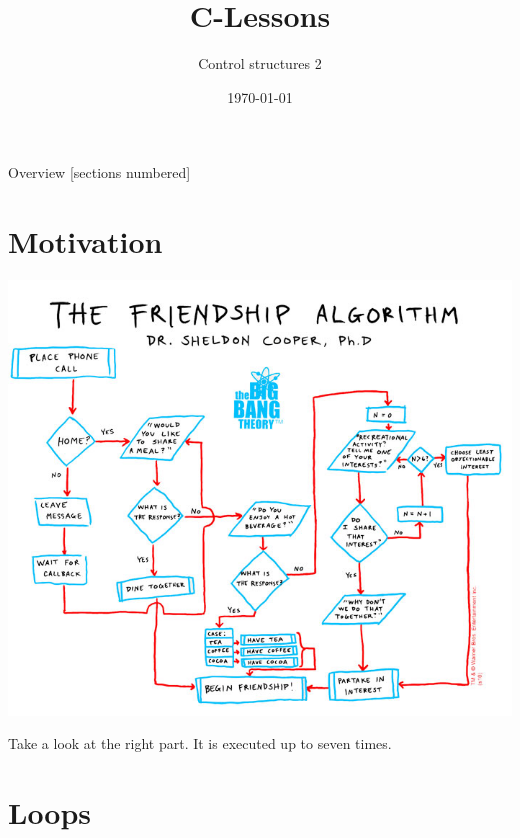 


\title{C-Lessons}
\subtitle{Control structures 2}
\date{\today}

\usepackage{mathtools}



\begin{frame}
	\titlepage
\end{frame}
\begin{frame}{Overview}
	[sections numbered]
	\tableofcontents
\end{frame}

\section{Motivation}

\begin{frame}
	\centerline{\includegraphics[scale=.32]{../img/friendship.jpg}}
	\bigskip
	Take a look at the right part. It is executed up to seven times.
\end{frame}
\section{Loops}

